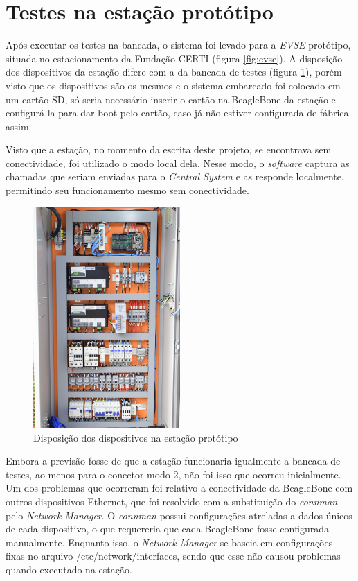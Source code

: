   \section{Testes na estação protótipo}
  \label{tests:evse}

    Após executar os testes na bancada, o sistema foi levado para a \textit{\ac{EVSE}} protótipo, situada no estacionamento da Fundação CERTI (figura \ref{fig:evse}). A disposição dos dispositivos da estação difere com a da bancada de testes (figura \ref{fig:setup-evse}), porém visto que os dispositivos são os mesmos e o sistema embarcado foi colocado em um cartão SD, só seria necessário inserir o cartão na BeagleBone da estação e configurá-la para dar boot pelo cartão, caso já não estiver configurada de fábrica assim.

    Visto que a estação, no momento da escrita deste projeto, se encontrava sem conectividade, foi utilizado o modo local dela. Nesse modo, o \textit{software} captura as chamadas que seriam enviadas para o \textit{Central System} e as responde localmente, permitindo seu funcionamento mesmo sem conectividade. 

    \begin{figure}[H]
      \begin{center}
        \includegraphics[width=0.5\textwidth,natwidth=1420,natheight=2130]{assets/images/setup-evse.jpg}
        \caption{Disposição dos dispositivos na estação protótipo}
        \label{fig:setup-evse}
      \end{center}
    \end{figure}

    Embora a previsão fosse de que a estação funcionaria igualmente a bancada de testes, ao menos para o conector modo 2, não foi isso que ocorreu inicialmente. Um dos problemas que ocorreram foi relativo a conectividade da BeagleBone com outros dispositivos Ethernet, que foi resolvido com a substituição do \textit{connman} pelo \textit{Network Manager}. O \textit{connman} possui configurações atreladas a dados únicos de cada dispositivo, o que requereria que cada BeagleBone fosse configurada manualmente. Enquanto isso, o \textit{Network Manager} se baseia em configurações fixas no arquivo /etc/network/interfaces, sendo que esse não causou problemas quando executado na estação.

